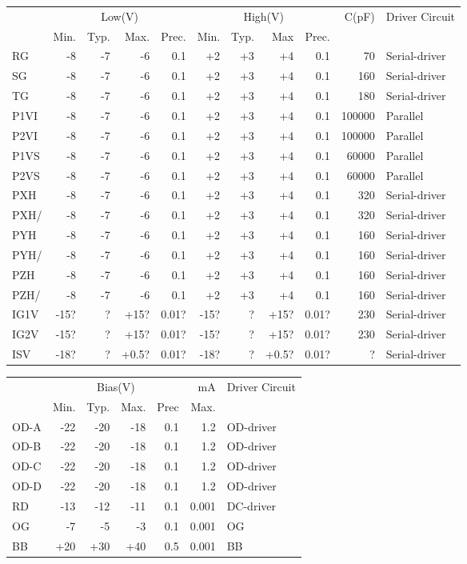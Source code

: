 \documentclass[a4paper,12pt]{article}
\begin{document}
\begin{tabular}{|l|rrrr|rrrr|r|l|}
\hline
&\multicolumn{4}{c|}{Low(V)}&\multicolumn{4}{c|}{High(V)}& C(pF)& Driver Circuit \\ 
&Min.&Typ.&Max.&Prec.&Min.&Typ.&Max&Prec.&& \\
\hline
RG & -8 & -7 & -6 & 0.1 & +2 & +3 & +4 & 0.1 & 70 & Serial-driver \\
SG & -8 & -7 & -6 & 0.1 & +2 & +3 & +4 & 0.1 & 160 & Serial-driver \\
TG & -8 & -7 & -6 & 0.1 & +2 & +3 & +4 & 0.1 & 180 & Serial-driver \\
P1VI & -8 & -7 & -6 & 0.1 & +2 & +3 & +4 & 0.1 & 100000 & Parallel \\
P2VI & -8 & -7 & -6 & 0.1 & +2 & +3 & +4 & 0.1 & 100000 & Parallel \\
P1VS & -8 & -7 & -6 & 0.1 & +2 & +3 & +4 & 0.1 & 60000 & Parallel \\
P2VS & -8 & -7 & -6 & 0.1 & +2 & +3 & +4 & 0.1 & 60000 & Parallel \\
PXH & -8 & -7 & -6 & 0.1 & +2 & +3 & +4 & 0.1 & 320 & Serial-driver \\
PXH/ & -8 & -7 & -6 & 0.1 & +2 & +3 & +4 & 0.1 & 320 & Serial-driver \\
PYH & -8 & -7 & -6 & 0.1 & +2 & +3 & +4 & 0.1 & 160 & Serial-driver \\
PYH/ & -8 & -7 & -6 & 0.1 & +2 & +3 & +4 & 0.1 & 160 & Serial-driver \\
PZH & -8 & -7 & -6 & 0.1 & +2 & +3 & +4 & 0.1 & 160 & Serial-driver \\
PZH/ & -8 & -7 & -6 & 0.1 & +2 & +3 & +4 & 0.1 & 160 & Serial-driver \\
IG1V & -15? & ? & +15? & 0.01? & -15? & ? & +15? & 0.01? & 230 & Serial-driver \\
IG2V & -15? & ? & +15? & 0.01? & -15? & ? & +15? & 0.01? & 230 & Serial-driver \\
ISV & -18? & ? & +0.5? & 0.01? & -18? & ? & +0.5? & 0.01? & ? & Serial-driver \\
\hline
\end{tabular}

\begin{tabular}{|l|rrrr|r|l|}
\hline
&\multicolumn{4}{c|}{Bias(V)} &mA&Driver Circuit \\
&Min.& Typ.& Max.&Prec& Max.&\\
\hline
OD-A &-22 &-20& -18& 0.1&1.2&OD-driver \\
OD-B &-22 &-20& -18& 0.1&1.2&OD-driver \\
OD-C &-22 &-20& -18& 0.1&1.2&OD-driver \\
OD-D &-22 &-20& -18& 0.1&1.2&OD-driver \\
RD &-13& -12 &-11& 0.1&0.001&DC-driver \\
OG& -7& -5& -3&  0.1&0.001&OG \\
BB &+20 &+30 &+40 &0.5&0.001&BB \\
\hline
\end{tabular}
\end{document}
